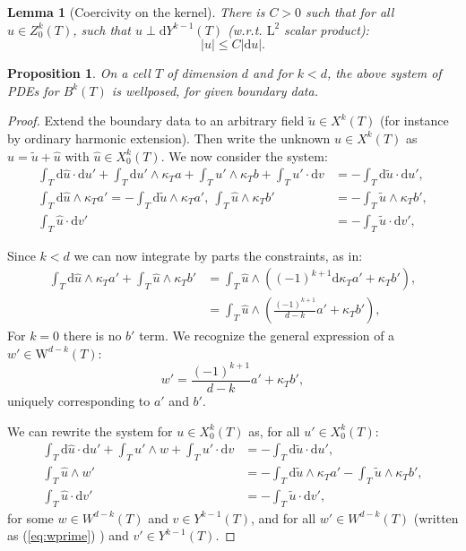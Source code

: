 \documentclass[10pt,a4paper]{amsart}
\newtheorem{proposition}{Proposition}
\newtheorem{lemma}{Lemma}
\newcommand{\Whitney}{\rmW}
\newcommand{\rmL}{\mathrm{L}}
\newcommand{\rmW}{\mathrm{W}}
\newcommand{\rmd}{\mathrm{d}}
\begin{document}
\begin{lemma}[Coercivity on the kernel]\label{lem:coerker}
  There is $C>0$ such that for all $u \in Z^k_0(T)$, such that $u \perp \rmd Y^{k-1}(T)$ (w.r.t. $\rmL^2$ scalar product):
\begin{equation}
   |u| \leq C | \rmd u|.
\end{equation}
\end{lemma}

\begin{proposition} On a cell $T$ of dimension $d$ and for $k < d$, the above system of PDEs for $B^k(T)$ is wellposed, for given boundary data.
\end{proposition}

\begin{proof}
Extend the boundary data to an arbitrary field $\tilde u \in X^k(T)$ (for instance by ordinary harmonic extension). Then write the unknown $u \in X^k(T)$ as $u = \tilde u + \hat u$ with $\hat u \in X^k_0(T)$. We now consider the system:
\begin{align}
  \int_T \rmd \hat u \cdot \rmd u' + \int_T \rmd u' \wedge \kappa_T a + \int_T u' \wedge \kappa_T b + \int_T u' \cdot \rmd v & = - \int_T \rmd \tilde u \cdot \rmd u',\\
  \int_T \rmd \hat u \wedge \kappa_T a' = - \int_T \rmd \tilde u \wedge \kappa_T a'  ,\ \int_T \hat u \wedge \kappa_T b' & = - \int_T \tilde u \wedge \kappa_T b' ,\\
  \int_T \hat u \cdot \rmd v' & =  - \int_T \tilde u \cdot \rmd v' ,
\end{align}


Since $k < d$ we can now integrate by parts the constraints, as in:
\begin{align}
\int_T \rmd \hat u \wedge \kappa_T a' + \int_T \hat u \wedge \kappa_T b' & = \int_T \hat u \wedge ( (-1)^{k+1} \rmd \kappa_T a' + \kappa_T b'),\\
&=  \int_T \hat u \wedge (\frac{(-1)^{k+1}}{d-k} a' + \kappa_T b') ,
\end{align}
For $k = 0$ there is no $b'$ term. %
We recognize the general expression of a $w' \in \Whitney^{d-k}(T)$:
\begin{equation}\label{eq:wprime}
  w' = \frac{(-1)^{k+1}}{d-k} a' + \kappa_T b',
\end{equation}
uniquely corresponding to $a'$ and $b'$.

We can rewrite the system for  $u \in X^k_0(T)$ as, for all $u' \in X^k_0(T)$:
\begin{align}
  \int_T \rmd \hat u \cdot \rmd u' + \int_T u' \wedge w + \int_T u' \cdot \rmd v & = - \int_T \rmd \tilde u \cdot \rmd u',\\
  \int_T  \hat u \wedge w' & = - \int_T \rmd \tilde u \wedge \kappa_T a' - \int_T \tilde u \wedge \kappa_T b', \\
  \int_T \hat u \cdot \rmd v' & =  - \int_T \tilde u \cdot \rmd v' ,
\end{align}
for some $w \in W^{d-k}(T)$ and $v \in Y^{k-1}(T)$, and for all $w' \in W^{d-k}(T)$ (written as (\ref{eq:wprime}) ) and $v' \in Y^{k-1}(T)$.



\end{proof}
\end{document}
